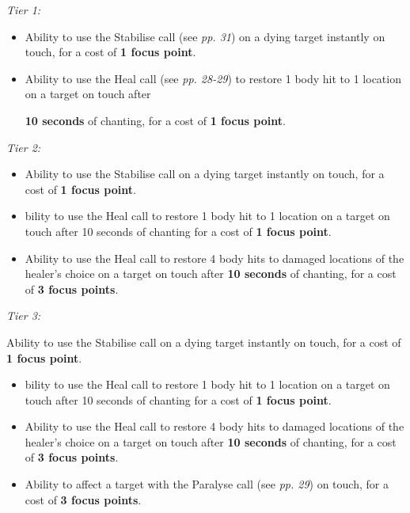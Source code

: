 \documentclass{scrbook}
\begin{document}
\textit{Tier 1:}

\begin{itemize}
\item Ability to use the Stabilise call (see \textit{pp. 31}) on a dying target instantly on touch, for a cost of \textbf{1 focus point}.

\item Ability to use the Heal call (see \textit{pp. 28-29}) to restore 1 body hit to 1 location on a target on touch after

\textbf{10 seconds} of chanting, for a cost of \textbf{1 focus point}.

\end{itemize}
\textit{Tier 2:}

\begin{itemize}
\item Ability to use the Stabilise call on a dying target instantly on touch, for a cost of \textbf{1 focus point}.

\item bility to use the Heal call to restore 1 body hit to 1 location on a target on touch after 10 seconds of chanting for a cost of \textbf{1 focus point}.

\item Ability to use the Heal call to restore 4 body hits to damaged locations of the healer's choice on a target on touch after \textbf{10 seconds} of chanting, for a cost of \textbf{3 focus points}.

\end{itemize}
\textit{Tier 3:}

Ability to use the Stabilise call on a dying target instantly on touch, for a cost of \textbf{1 focus point}.

\begin{itemize}
\item bility to use the Heal call to restore 1 body hit to 1 location on a target on touch after 10 seconds of chanting for a cost of \textbf{1 focus point}.

\item Ability to use the Heal call to restore 4 body hits to damaged locations of the healer's choice on a target on touch after \textbf{10 seconds} of chanting, for a cost of \textbf{3 focus points}.

\item Ability to affect a target with the Paralyse call (see \textit{pp. 29}) on touch, for a cost of \textbf{3 focus points}.

\end{itemize}
\end{document}
